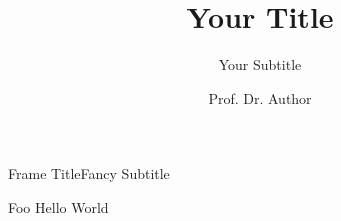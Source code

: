 \documentclass[12pt,aspectratio=169,t]{beamer}
\author{Prof. Dr. Author}
\title{Your Title}
\subtitle{Your Subtitle}
\begin{document}
\maketitle

\begin{frame}{Frame Title}{Fancy Subtitle}
\begin{block}{Foo}
Hello World
\end{block}
\end{frame}
\end{document}
